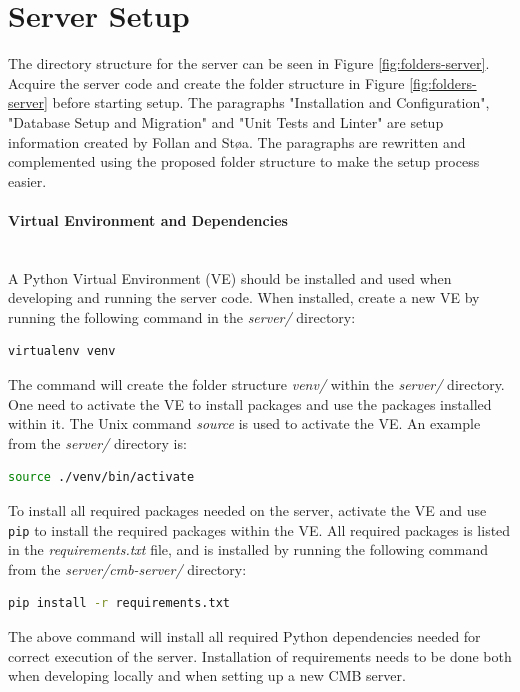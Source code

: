 \section{Server Setup}
\label{sec:ssetup}
The directory structure for the server can be seen in Figure \ref{fig:folders-server}. Acquire the server code and create the folder structure in Figure \ref{fig:folders-server} before starting setup. The paragraphs "Installation and Configuration", "Database Setup and Migration" and "Unit Tests and Linter" are setup information created by Follan and Støa. The paragraphs are rewritten and complemented using the proposed folder structure to make the setup process easier.

\paragraph*{Virtual Environment and Dependencies} \hfill \\
A Python Virtual Environment (VE) \cite{VIRTUALENV} should be installed and used when developing and running the server code. When installed, create a new VE by running the following command in the \textit{server/} directory:
\begin{lstlisting}[language=sh]
virtualenv venv
\end{lstlisting}
The command will create the folder structure \textit{venv/} within the \textit{server/} directory. One need to activate the VE to install packages and use the packages installed within it. The Unix command \textit{source} is used to activate the VE. An example from the \textit{server/} directory is:
\begin{lstlisting}[language=sh]
source ./venv/bin/activate
\end{lstlisting}

To install all required packages needed on the server, activate the VE and use \texttt{pip} \cite{PIP} to install the required packages within the VE. All required packages is listed in the \textit{requirements.txt} file, and is installed by running the following command from the \textit{server/cmb-server/} directory:
\begin{lstlisting}[language=sh]
pip install -r requirements.txt
\end{lstlisting}
The above command will install all required Python dependencies needed for correct execution of the server. Installation of requirements needs to be done both when developing locally and when setting up a new CMB server. \\

